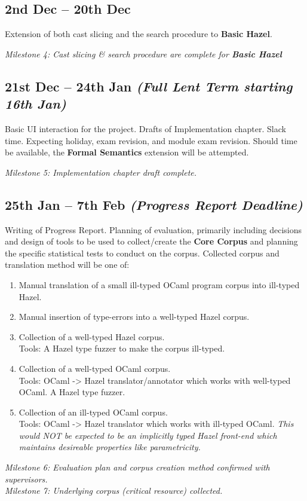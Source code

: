 \subsection*{2nd Dec -- 20th Dec}
Extension of both cast slicing and the search procedure to \textbf{Basic Hazel}.\par 
\textit{Milestone 4: Cast slicing \& search procedure are complete for \textbf{Basic Hazel}}

\subsection*{21st Dec -- 24th Jan \textit{(Full Lent Term starting 16th Jan)}}
Basic UI interaction for the project. Drafts of Implementation chapter. Slack time. Expecting holiday, exam revision, and module exam revision. Should time be available, the \textbf{Formal Semantics} extension will be attempted.\par
\textit{Milestone 5: Implementation chapter draft complete.}

\subsection*{25th Jan -- 7th Feb \textit{(Progress Report Deadline)}}
Writing of Progress Report. Planning of evaluation, primarily including decisions and design of tools to be used to collect/create the \textbf{Core Corpus} and planning the specific statistical tests to conduct on the corpus. Collected corpus and translation method will be one of:
\begin{enumerate}
\item Manual translation of a small ill-typed OCaml program corpus into ill-typed Hazel.
\item Manual insertion of type-errors into a well-typed Hazel corpus.
\item Collection of a well-typed Hazel corpus.\\ 
Tools: A Hazel type fuzzer to make the corpus ill-typed.
\item Collection of a well-typed OCaml corpus.
\\Tools: OCaml -> Hazel translator/annotator which works with well-typed OCaml. A Hazel type fuzzer.
\item Collection of an ill-typed OCaml corpus. 
\\Tools: OCaml -> Hazel translator which works with ill-typed OCaml. \textit{This would NOT be expected to be an implicitly typed Hazel front-end which maintains desireable properties like parametricity.} 
\end{enumerate}
\textit{Milestone 6: Evaluation plan and corpus creation method confirmed with supervisors.}\\
\textit{Milestone 7: Underlying corpus (critical resource) collected.}

